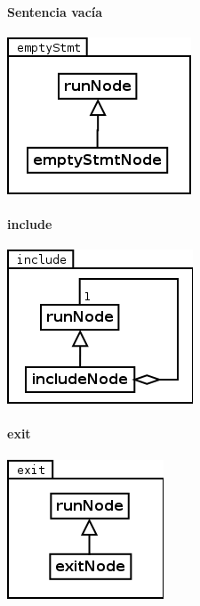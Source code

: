 \paragraph{Sentencia vacía}
\begin{center}
\includegraphics[scale=0.4]{emptyStmt.png} \\
\end{center}

\paragraph{include}
\begin{center}
\includegraphics[scale=0.4]{include.png} \\
\end{center}

\paragraph{exit}
\begin{center}
\includegraphics[scale=0.4]{exit.png} \\
\end{center}

